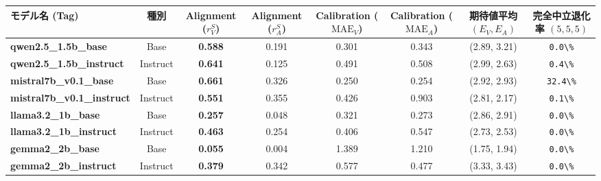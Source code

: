 \begin{center}
\small
\begin{tabular}{lccccccc}
\toprule
\textbf{モデル名 (Tag)} & \textbf{種別} & \textbf{Alignment ($r_V^S$)} & \textbf{Alignment ($r_A^S$)} & \textbf{Calibration ($\text{MAE}_V$)} & \textbf{Calibration ($\text{MAE}_A$)} & \textbf{期待値平均 $(E_V, E_A)$} & \textbf{完全中立退化率 $(5,5,5)$} \\
\midrule
\textbf{qwen2.5\_1.5b\_base} & Base & \textbf{0.588} & 0.191 & 0.301 & 0.343 & (2.89, 3.21) & \texttt{0.0\textbackslash{}\%} \\
\textbf{qwen2.5\_1.5b\_instruct} & Instruct & \textbf{0.641} & 0.125 & 0.491 & 0.508 & (2.99, 2.63) & \texttt{0.4\textbackslash{}\%} \\
\textbf{mistral7b\_v0.1\_base} & Base & \textbf{0.661} & 0.326 & 0.250 & 0.254 & (2.92, 2.93) & \texttt{32.4\textbackslash{}\%} \\
\textbf{mistral7b\_v0.1\_instruct} & Instruct & \textbf{0.551} & 0.355 & 0.426 & 0.903 & (2.81, 2.17) & \texttt{0.1\textbackslash{}\%} \\
\textbf{llama3.2\_1b\_base} & Base & \textbf{0.257} & 0.048 & 0.321 & 0.273 & (2.86, 2.91) & \texttt{0.0\textbackslash{}\%} \\
\textbf{llama3.2\_1b\_instruct} & Instruct & \textbf{0.463} & 0.254 & 0.406 & 0.547 & (2.73, 2.53) & \texttt{0.0\textbackslash{}\%} \\
\textbf{gemma2\_2b\_base} & Base & \textbf{0.055} & 0.004 & 1.389 & 1.210 & (1.75, 1.94) & \texttt{0.0\textbackslash{}\%} \\
\textbf{gemma2\_2b\_instruct} & Instruct & \textbf{0.379} & 0.342 & 0.577 & 0.477 & (3.33, 3.43) & \texttt{0.0\textbackslash{}\%} \\
\bottomrule
\end{tabular}
\end{center}

